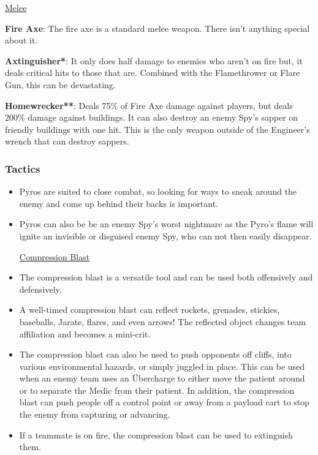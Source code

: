 \newpage

\begin {center}
\underline {Melee}
\end {center}

{\bf Fire Axe}: The fire axe is a standard melee weapon.  There isn't anything special about it.

{\bf Axtinguisher*}: It only does half damage to enemies who aren't on fire but, it deals critical hits to those that are. Combined with the Flamethrower or Flare Gun, this can be devastating. 

{\bf Homewrecker**}: Deals 75\% of Fire Axe damage against players, but deals 200\% damage against buildings. It can also destroy an enemy Spy's sapper on friendly buildings with one hit. This is the only weapon outside of the Engineer's wrench that can destroy sappers.


\subsubsection {Tactics}
\begin {itemize}
\item Pyros are suited to close combat, so looking for ways to sneak around the enemy and come up behind their backs is important.

\item Pyros can also be be an enemy Spy's worst nightmare as the Pyro's flame will ignite an invisible or disguised enemy Spy, who can not then easily disappear.
\begin {center}
\underline {Compression Blast}
\end {center}
\item The compression blast is a versatile tool and can be used both offensively and defensively.

\item A well-timed compression blast can reflect rockets, grenades, stickies, baseballs, Jarate, flares, and even arrows! The reflected object changes team affiliation and becomes a mini-crit.

\item The compression blast can also be used to push opponents off cliffs, into various environmental hazards, or simply juggled in place. This can be used when an enemy team uses an Übercharge to either move the patient around or to separate the Medic from their patient. In addition, the compression blast can push people off a control point or away from a payload cart to stop the enemy from capturing or advancing.

\item If a teammate is on fire, the compression blast can be used to extinguish them.
\end {itemize}